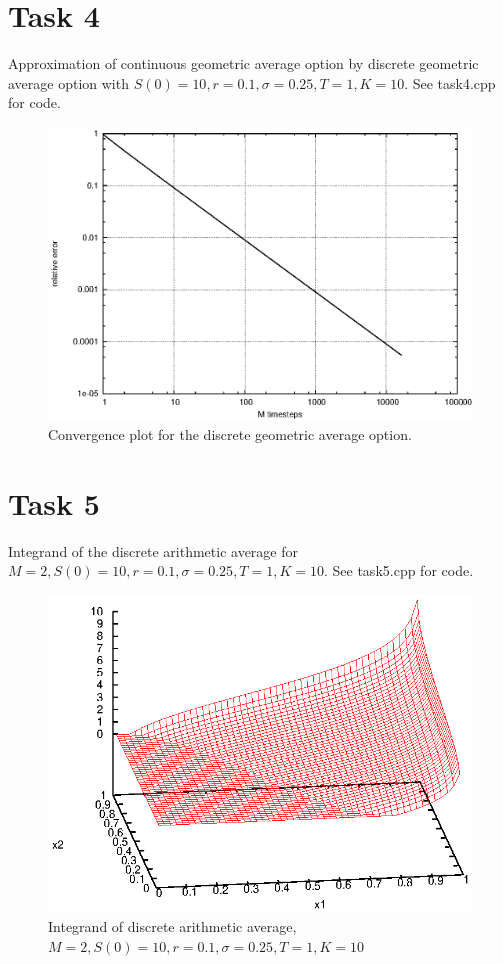 \documentclass[]{article}
\begin{document}
\section*{Task 4} Approximation of continuous geometric average option by discrete geometric average option with $S(0)=10,r=0.1,\sigma=0.25,T=1,K=10$. See task4.cpp for code.
\begin{figure}[!ht]
\centering
\includegraphics[width=.9\textwidth]{task4.eps}
\caption{Convergence plot for the discrete geometric average option.}
\label{fig:Task4}
\end{figure}
\clearpage

\section*{Task 5} Integrand of the discrete arithmetic average for $M=2,S(0)=10,r=0.1,\sigma=0.25,T=1,K=10$. See task5.cpp for code.\\
\begin{figure}[!ht]
\centering
\includegraphics[width=.9\textwidth]{task5_1}
\caption{Integrand of discrete arithmetic average, $M=2,S(0)=10,r=0.1,\sigma=0.25,T=1,K=10$}
\label{fig:Task5}
\end{figure}
\end{document}
